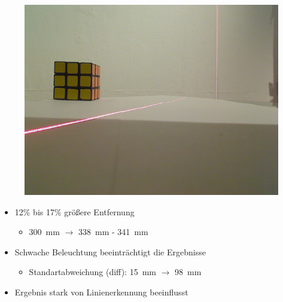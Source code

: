\documentclass[xcolor=dvipsnames]{beamer}
\begin{document}
\begin{frame}
\begin{figure}
\begin{minipage}{0.32\linewidth}
			\includegraphics[width=\linewidth]{includes/test_repeat_3}
		\end{minipage}
	\end{figure}

	\begin{itemize}
		\item 12\% bis 17\% größere Entfernung
		\begin{itemize}
			\item 300~mm $\rightarrow$ 338~mm - 341~mm
		\end{itemize}
		\item Schwache Beleuchtung beeinträchtigt die Ergebnisse
		\begin{itemize}
			\item Standartabweichung (diff): 15~mm $\rightarrow$ 98~mm
		\end{itemize}
		\item Ergebnis stark von Linienerkennung beeinflusst
	\end{itemize}

\end{frame}

\end{document}
